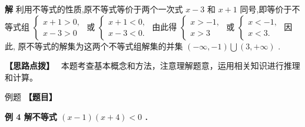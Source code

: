 \documentclass[a4paper,10pt,oneside,fontset=none]{ctexbook}
\newcounter{example}[chapter]
\newenvironment{example}[1][]{\begin{exBox}{例题}{#1}}{\end{exBox}}
\numberwithin{equation}{chapter}
\newenvironment{solution}{\begin{solutionBox}}{\end{solutionBox}}
\newenvironment{hint}{\begin{hintBox}\textbf{【思路点拨】}~}{\end{hintBox}}
\begin{document}
\begin{solution}
\textbf{解}
利用不等式的性质,原不等式等价于两个一次式 $x - 3$ 和 $x + 1$ 同号,即等价于不等式组 $\left\{  \begin{array}{l} x + 1 > 0, \\  x - 3 > 0 \end{array}\right.$ 或 $\left\{  \begin{array}{l} x + 1 < 0, \\  x - 3 < 0. \end{array}\right.$
由此得 $\left\{  \begin{array}{l} x >  - 1, \\  x > 3 \end{array}\right.$ 或 $\left\{  \begin{array}{l} x <  - 1, \\  x < 3. \end{array}\right.$
因此, 原不等式的解集为这两个不等式组解集的并集 $\left( {-\infty , - 1}\right) \bigcup \left( {3, + \infty }\right)$ .
\end{solution}

\begin{hint}
本题考查基本概念和方法，注意理解题意，运用相关知识进行推理和计算。
\end{hint}

\begin{example}
\textbf{【题目】}\par\vspace{0.3em}
\textbf{例 4 解不等式 $\left( {x - 1}\right) \left( {x + 4}\right)  < 0$ .}\par\vspace{0.3em}
\end{example}
\end{document}
